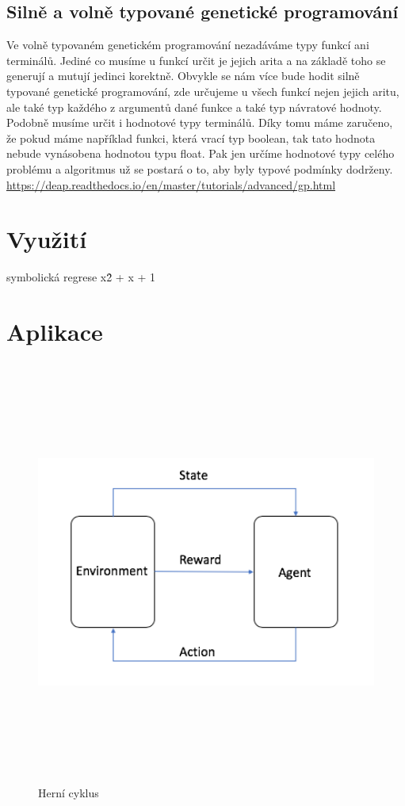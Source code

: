 \subsection{Silně a volně typované genetické programování}
Ve volně typovaném genetickém programování nezadáváme typy funkcí ani terminálů. Jediné co musíme u funkcí určit je jejich arita a na základě toho se generují a mutují jedinci korektně.
Obvykle se nám více bude hodit silně typované genetické programování, zde určujeme u všech funkcí nejen jejich aritu, ale také typ každého z argumentů dané funkce a také typ návratové hodnoty.
Podobně musíme určit i hodnotové typy terminálů. Díky tomu máme zaručeno, že pokud máme například funkci, která vrací typ boolean, tak tato hodnota nebude vynásobena hodnotou typu float. 
Pak jen určíme hodnotové typy celého problému a algoritmus už se postará o to, aby byly typové podmínky dodrženy.
\url{https://deap.readthedocs.io/en/master/tutorials/advanced/gp.html}

\section{Využití}
symbolická regrese x\^2 + x + 1

\section{Aplikace}





\begin{figure}[p]\centering
\includegraphics[width=140mm, height=140mm]{./agent_enviroment}
\caption{Herní cyklus}
\label{obr03:Nhust}
\end{figure}
